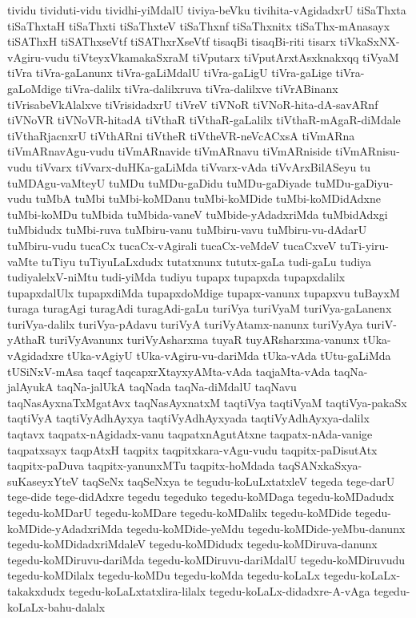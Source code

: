 {tividu
tividuti-vidu
tividhi-yiMdalU
tiviya-beVku
tivihita-vAgidadxrU
tiSaThxta
tiSaThxtaH
tiSaThxti
tiSaThxteV
tiSaThxnf
tiSaThxnitx
tiSaThx-mAnasayx
tiSAThxH
tiSAThxseVtf
tiSAThxrXseVtf
tisaqBi
tisaqBi-riti
tisarx
tiVkaSxNX-vAgiru-vudu
tiVteyxVkamakaSxraM
tiVputarx
tiVputArxtAsxknakxqq
tiVyaM
tiVra
tiVra-gaLanunx
tiVra-gaLiMdalU
tiVra-gaLigU
tiVra-gaLige
tiVra-gaLoMdige
tiVra-dalilx
tiVra-dalilxruva
tiVra-dalilxve
tiVrABinanx
tiVrisabeVkAlalxve
tiVrisidadxrU
tiVreV
tiVNoR
tiVNoR-hita-dA-savARnf
tiVNoVR
tiVNoVR-hitadA
tiVthaR
tiVthaR-gaLalilx
tiVthaR-mAgaR-diMdale
tiVthaRjacnxrU
tiVthARni
tiVtheR
tiVtheVR-neVcACxsA
tiVmARna
tiVmARnavAgu-vudu
tiVmARnavide
tiVmARnavu
tiVmARniside
tiVmARnisu-vudu
tiVvarx
tiVvarx-duHKa-gaLiMda
tiVvarx-vAda
tiVvArxBilASeyu
tu
tuMDAgu-vaMteyU
tuMDu
tuMDu-gaDidu
tuMDu-gaDiyade
tuMDu-gaDiyu-vudu
tuMbA
tuMbi
tuMbi-koMDanu
tuMbi-koMDide
tuMbi-koMDidAdxne
tuMbi-koMDu
tuMbida
tuMbida-vaneV
tuMbide-yAdadxriMda
tuMbidAdxgi
tuMbidudx
tuMbi-ruva
tuMbiru-vanu
tuMbiru-vavu
tuMbiru-vu-dAdarU
tuMbiru-vudu
tucaCx
tucaCx-vAgirali
tucaCx-veMdeV
tucaCxveV
tuTi-yiru-vaMte
tuTiyu
tuTiyuLaLxdudx
tutatxnunx
tututx-gaLa
tudi-gaLu
tudiya
tudiyalelxV-niMtu
tudi-yiMda
tudiyu
tupapx
tupapxda
tupapxdalilx
tupapxdalUlx
tupapxdiMda
tupapxdoMdige
tupapx-vanunx
tupapxvu
tuBayxM
turaga
turagAgi
turagAdi
turagAdi-gaLu
turiVya
turiVyaM
turiVya-gaLanenx
turiVya-dalilx
turiVya-pAdavu
turiVyA
turiVyAtamx-nanunx
turiVyAya
turiV-yAthaR
turiVyAvanunx
turiVyAsharxma
tuyaR
tuyARsharxma-vanunx
tUka-vAgidadxre
tUka-vAgiyU
tUka-vAgiru-vu-dariMda
tUka-vAda
tUtu-gaLiMda
tUSiNxV-mAsa
taqcf
taqcapxrXtayxyAMta-vAda
taqjaMta-vAda
taqNa-jalAyukA
taqNa-jalUkA
taqNada
taqNa-diMdalU
taqNavu
taqNasAyxnaTxMgatAvx
taqNasAyxnatxM
taqtiVya
taqtiVyaM
taqtiVya-pakaSx
taqtiVyA
taqtiVyAdhAyxya
taqtiVyAdhAyxyada
taqtiVyAdhAyxya-dalilx
taqtavx
taqpatx-nAgidadx-vanu
taqpatxnAgutAtxne
taqpatx-nAda-vanige
taqpatxsayx
taqpAtxH
taqpitx
taqpitxkara-vAgu-vudu
taqpitx-paDisutAtx
taqpitx-paDuva
taqpitx-yanunxMTu
taqpitx-hoMdada
taqSANxkaSxya-suKaseyxYteV
taqSeNx
taqSeNxya
te
tegudu-koLuLxtatxleV
tegeda
tege-darU
tege-dide
tege-didAdxre
tegedu
tegeduko
tegedu-koMDaga
tegedu-koMDadudx
tegedu-koMDarU
tegedu-koMDare
tegedu-koMDalilx
tegedu-koMDide
tegedu-koMDide-yAdadxriMda
tegedu-koMDide-yeMdu
tegedu-koMDide-yeMbu-danunx
tegedu-koMDidadxriMdaleV
tegedu-koMDidudx
tegedu-koMDiruva-danunx
tegedu-koMDiruvu-dariMda
tegedu-koMDiruvu-dariMdalU
tegedu-koMDiruvudu
tegedu-koMDilalx
tegedu-koMDu
tegedu-koMda
tegedu-koLaLx
tegedu-koLaLx-takakxdudx
tegedu-koLaLxtatxlira-lilalx
tegedu-koLaLx-didadxre-A-vAga
tegedu-koLaLx-bahu-dalalx
}
